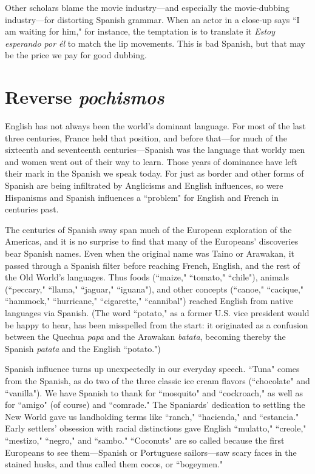 Other scholars blame the movie industry---and especially the
movie-dubbing industry---for distorting Spanish grammar. When an
actor in a close-up says ``I am waiting for him," for instance, the temptation is to translate it \emph{Estoy esperando por él} to match the lip movements. This is bad Spanish, but that may be the price we pay for good
dubbing.

\section{Reverse \emph{pochismos}}

English has not always been the world's dominant language.
For most of the last three centuries, France held that position, and before that---for much of the sixteenth and seventeenth centuries---Spanish was the language that worldy men and women went out of their
way to learn. Those years of dominance have left their mark in the
Spanish we speak today. For just as border and other forms of Spanish
are being infiltrated by Anglicisms and English influences, so were Hispanisms and Spanish influences a ``problem" for English and French in
centuries past.

The centuries of Spanish sway span much of the European
exploration of the Americas, and it is no surprise to find that many of the
Europeans' discoveries bear Spanish names. Even when the original
name was Taino or Arawakan, it passed through a Spanish filter before
reaching French, English, and the rest of the Old World's languages.
Thus foods (``maize," ``tomato," ``chile"), animals (``peccary," ``llama,"
``jaguar," ``iguana"), and other concepts (``canoe," ``cacique," ``hammock," ``hurricane," ``cigarette," ``cannibal") reached English from native languages via Spanish. (The word ``potato," as a former U.S. vice
president would be happy to hear, has been misspelled from the start:
it originated as a confusion between the Quechua \emph{papa} and the Arawakan \emph{batata}, becoming thereby the Spanish \emph{patata} and the English
``potato.")

Spanish influence turns up unexpectedly in our everyday
speech. ``Tuna" comes from the Spanish, as do two of the three classic
ice cream flavors (``chocolate" and ``vanilla"). We have Spanish to
thank for ``mosquito" and ``cockroach," as well as for ``amigo" (of
course) and ``comrade." The Spaniards' dedication to settling the New
World gave us landholding terms like ``ranch," ``hacienda," and ``estancia." Early settlers' obsession with racial distinctions gave English
``mulatto," ``creole," ``mestizo," ``negro," and ``sambo." ``Coconuts" are
so called because the first Europeans to see them---Spanish or Portuguese sailors---saw scary faces in the stained husks, and thus called
them cocos, or ``bogeymen."

